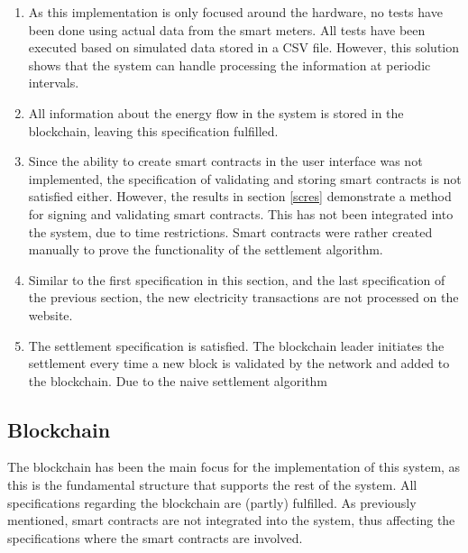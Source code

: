 \begin{enumerate}
\item As this implementation is only focused around the hardware, no tests have been done using actual data from the smart meters. All tests have been executed based on simulated data stored in a CSV file. However, this solution shows that the system can handle processing the information at periodic intervals. 
\item All information about the energy flow in the system is stored in the blockchain, leaving this specification fulfilled. 
\item Since the ability to create smart contracts in the user interface was not implemented, the specification of validating and storing smart contracts is not satisfied either. However, the results in section \ref{scres} demonstrate a method for signing and validating smart contracts. This has not been integrated into the system, due to time restrictions. Smart contracts were rather created manually to prove the functionality of the settlement algorithm. 
\item Similar to the first specification in this section, and the last specification of the previous section, the new electricity transactions are not processed on the website. 
\item The settlement specification is satisfied. The blockchain leader initiates the settlement every time a new block is validated by the network and added to the blockchain. Due to the naive settlement algorithm 
\end{enumerate}

\subsection*{Blockchain}
The blockchain has been the main focus for the implementation of this system, as this is the fundamental structure that supports the rest of the system. All specifications regarding the blockchain are (partly) fulfilled. As previously mentioned, smart contracts are not integrated into the system, thus affecting the specifications where the smart contracts are involved. 

